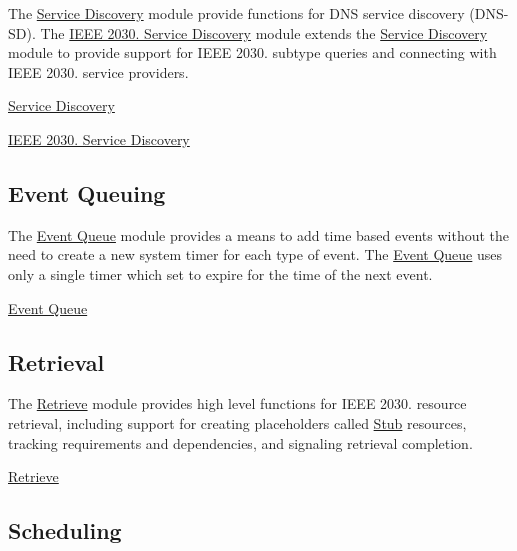 The \hyperlink{group__dnssd__client}{Service Discovery} module provide functions for D\+NS service discovery (D\+N\+S-\/\+SD). The \hyperlink{group__se__discover}{I\+E\+EE 2030. Service Discovery} module extends the \hyperlink{group__dnssd__client}{Service Discovery} module to provide support for I\+E\+EE 2030. subtype queries and connecting with I\+E\+EE 2030. service providers.


\begin{DoxyItemize}
\item \hyperlink{group__dnssd__client}{Service Discovery}
\item \hyperlink{group__se__discover}{I\+E\+EE 2030. Service Discovery}
\end{DoxyItemize}

\subsection*{Event Queuing }

The \hyperlink{group__event__queue}{Event Queue} module provides a means to add time based events without the need to create a new system timer for each type of event. The \hyperlink{group__event__queue}{Event Queue} uses only a single timer which set to expire for the time of the next event.


\begin{DoxyItemize}
\item \hyperlink{group__event__queue}{Event Queue}
\end{DoxyItemize}

\subsection*{Retrieval }

The \hyperlink{group__retrieve}{Retrieve} module provides high level functions for I\+E\+EE 2030. resource retrieval, including support for creating placeholders called \hyperlink{structStub}{Stub} resources, tracking requirements and dependencies, and signaling retrieval completion.


\begin{DoxyItemize}
\item \hyperlink{group__retrieve}{Retrieve}
\end{DoxyItemize}

\subsection*{Scheduling }

